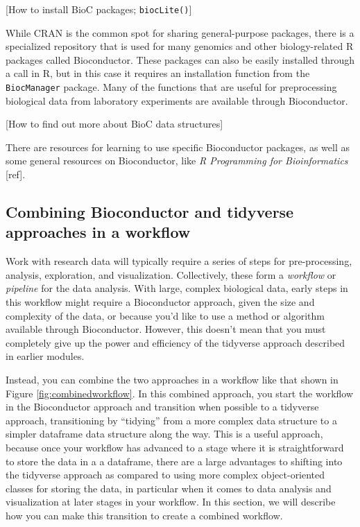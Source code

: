 \documentclass[]{tufte-book}
\begin{document}
{[}How to install BioC packages; \texttt{biocLite()}{]}

While CRAN is the common spot for sharing general-purpose packages, there is a
specialized repository that is used for many genomics and other biology-related
R packages called Bioconductor. These packages can also be easily installed
through a call in R, but in this case it requires an installation function from
the \texttt{BiocManager} package. Many of the functions that are useful for
preprocessing biological data from laboratory experiments are available through
Bioconductor.

{[}How to find out more about BioC data structures{]}

There are resources for learning to use specific Bioconductor packages, as well
as some general resources on Bioconductor, like \emph{R Programming for
Bioinformatics} {[}ref{]}.

\subsection{Combining Bioconductor and tidyverse approaches in a workflow}\label{combining-bioconductor-and-tidyverse-approaches-in-a-workflow}

Work with research data will typically require a series of steps for
pre-processing, analysis, exploration, and visualization. Collectively, these
form a \emph{workflow} or \emph{pipeline} for the data analysis. With large, complex
biological data, early steps in this workflow might require a Bioconductor
approach, given the size and complexity of the data, or because you'd like to
use a method or algorithm available through Bioconductor. However, this doesn't
mean that you must completely give up the power and efficiency of the tidyverse
approach described in earlier modules.

Instead, you can combine the two approaches in a workflow like that shown in
Figure \ref{fig:combinedworkflow}. In this combined approach, you start the
workflow in the Bioconductor approach and transition when possible to a
tidyverse approach, transitioning by ``tidying'' from a more complex data
structure to a simpler dataframe data structure along the way. This is a useful
approach, because once your workflow has advanced to a stage where it is
straightforward to store the data in a a dataframe, there are a large advantages
to shifting into the tidyverse approach as compared to using more complex
object-oriented classes for storing the data, in particular when it comes to
data analysis and visualization at later stages in your workflow. In this
section, we will describe how you can make this transition to create a combined
workflow.
\end{document}
